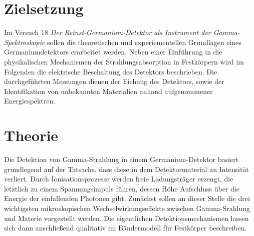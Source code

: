 \setcounter{page}{1}
\section*{Zielsetzung}
Im Versuch 18 \textit{Der Reinst-Germanium-Detektor als
Instrument der Gamma-Spektroskopie} sollen die theoretischen und experiementellen Grundlagen eines
Germaniumdetektors erarbeitet werden. Neben einer Einführung in die physikalischen Mechanismen der
Strahlungsabsorption in Festkörpern wird im Folgenden die elektrische Beschaltung des Detektors beschrieben. 
Die durchgeführten Messungen dienen der Eichung des Detektors, sowie der Identifikation von unbekannten 
Materialien anhand aufgenommener Energiespektren. 

\section{Theorie}
Die Detektion von Gamma-Strahlung in einem Germanium-Detektor basiert grundlegend auf der Tatsache, dass diese in dem 
Detektormaterial an Intensität verliert. Durch Ionisationsprozesse werden freie Ladungsträger erzeugt, die letztlich 
zu einem Spannungsimpuls führen, dessen Höhe Aufschluss über die Energie der einfallenden Photonen gibt. 
Zunächst sollen an dieser Stelle die drei wichtigsten mikroskopischen Wechselwirkungseffekte zwischen Gamma-Srahlung und
Materie vorgestellt werden. Die eigentlichen Detektionsmechanismen lassen sich dann anschließend qualitativ im 
Bändermodell für Festkörper beschreiben.

